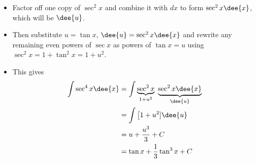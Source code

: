 \begin{eg}\label{eg:TRGINTe}
\soln
\begin{itemize}
 \item Factor off one copy of $\sec^2 x$ and combine it with $dx$
to form $\sec^2 x\dee{x}$, which will be $\dee{u}$.
\item Then substitute $u=\tan x$, $\dee{u}=\sec^2 x\dee{x}$ and rewrite any remaining even
powers of $\sec x$ as powers of $\tan x=u$ using $\sec^2x = 1+\tan^2 x=1+u^2$.
\item This gives
\begin{align*}
\int \sec^4 x\dee{x}
&= \int \underbrace{\sec^2 x}_{1+u^2}\
        \underbrace{\sec^2 x\dee{x}}_{\dee{u}}  \\
&= \int \big[1+u^2]\dee{u} \\
&=u+\frac{u^3}{3}+C \\
&=\tan x+\frac{1}{3}\tan^3 x + C
\end{align*}
\end{itemize}

\end{eg}
